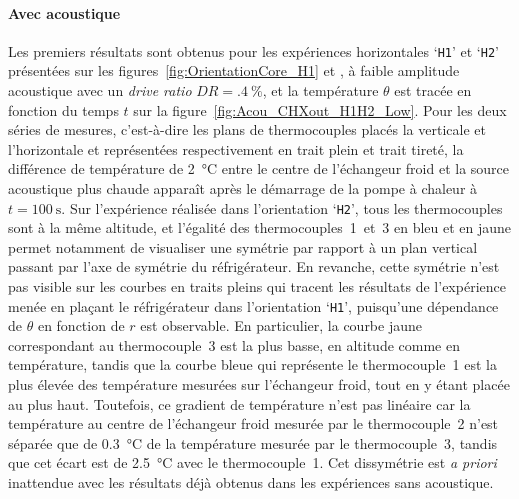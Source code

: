 \paragraph*{Avec acoustique}\label{chap:Acou_CHXout_H1H2_low}
Les premiers résultats sont obtenus pour les expériences horizontales `\texttt{H1}' et `\texttt{H2}' présentées sur les figures~\ref{fig:OrientationCore_H1} et , à faible amplitude acoustique avec un \textit{drive ratio} $DR=\qty{.4}{\percent}$, et la température $\theta$ est tracée en fonction du temps $t$ sur la figure~\ref{fig:Acou_CHXout_H1H2_Low}. Pour les deux séries de mesures, c'est-à-dire les plans de thermocouples placés la verticale et l'horizontale et représentées respectivement en trait plein et trait tireté, la différence de température de \qty{2}{\degreeCelsius} entre le centre de l'échangeur froid et la source acoustique plus chaude apparaît après le démarrage de la pompe à chaleur à $t=\qty{100}{\second}$. Sur l'expérience réalisée dans l'orientation `\texttt{H2}', tous les thermocouples sont à la même altitude, et l'égalité des thermocouples~1~et~3 en bleu et en jaune permet notamment de visualiser une symétrie par rapport à un plan vertical passant par l'axe de symétrie du réfrigérateur. En revanche, cette symétrie n'est pas visible sur les courbes en traits pleins qui tracent les résultats de l'expérience menée en plaçant le réfrigérateur dans l'orientation `\texttt{H1}', puisqu'une dépendance de $\theta$ en fonction de $r$ est observable. En particulier, la courbe jaune correspondant au thermocouple~3 est la plus basse, en altitude comme en température, tandis que la courbe bleue qui représente le thermocouple~1 est la plus élevée des température mesurées sur l'échangeur froid, tout en y étant placée au plus haut. Toutefois, ce gradient de température n'est pas linéaire car la température au centre de l'échangeur froid mesurée par le thermocouple~2 n'est séparée que de \qty{.3}{\degreeCelsius} de la température mesurée par le thermocouple~3, tandis que cet écart est de \qty{2.5}{\degreeCelsius} avec le thermocouple~1. Cet dissymétrie est \textit{a priori} inattendue avec les résultats déjà obtenus dans les expériences sans acoustique.
\smallskip


